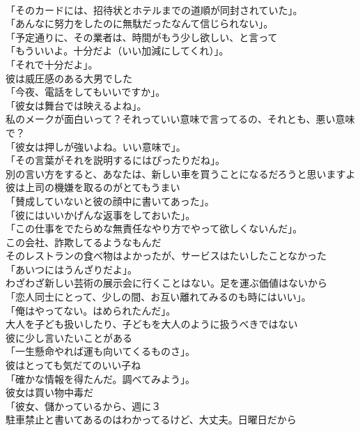 \documentclass[8pt]{extreport}
\begin{document}
\begin{CJK}{UTF8}{min}
\\	「そのカードには、招待状とホテルまでの道順が同封されていた」。	
\\	「あんなに努力をしたのに無駄だったなんて信じられない」。	
\\	「予定通りに、その業者は、時間がもう少し欲しい、と言って	
\\	「もういいよ。十分だよ（いい加減にしてくれ）」。	
\\	「それで十分だよ」。	
\\	彼は威圧感のある大男でした	
\\	「今夜、電話をしてもいいですか」。	
\\	「彼女は舞台では映えるよね」。	
\\	私のメークが面白いって？それっていい意味で言ってるの、それとも、悪い意味で？	
\\	「彼女は押しが強いよね。いい意味で」。	
\\	「その言葉がそれを説明するにはぴったりだね」。	
\\	別の言い方をすると、あなたは、新しい車を買うことになるだろうと思いますよ	
\\	彼は上司の機嫌を取るのがとてもうまい	
\\	「賛成していないと彼の顔中に書いてあった」。	
\\	「彼にはいいかげんな返事をしておいた」。	
\\	「この仕事をでたらめな無責任なやり方でやって欲しくないんだ」。	
\\	この会社、詐欺してるようなもんだ	
\\	そのレストランの食べ物はよかったが、サービスはたいしたことなかった	
\\	「あいつにはうんざりだよ」。	
\\	わざわざ新しい芸術の展示会に行くことはない。足を運ぶ価値はないから	
\\	「恋人同士にとって、少しの間、お互い離れてみるのも時にはいい」。	
\\	「俺はやってない。はめられたんだ」。	
\\	大人を子ども扱いしたり、子どもを大人のように扱うべきではない	
\\	彼に少し言いたいことがある	
\\	「一生懸命やれば運も向いてくるものさ」。	
\\	彼はとっても気だてのいい子ね	
\\	「確かな情報を得たんだ。調べてみよう」。	
\\	彼女は買い物中毒だ	
\\	「彼女、儲かっているから、週に３	
\\	駐車禁止と書いてあるのはわかってるけど、大丈夫。日曜日だから	

\end{CJK}
\end{document}
